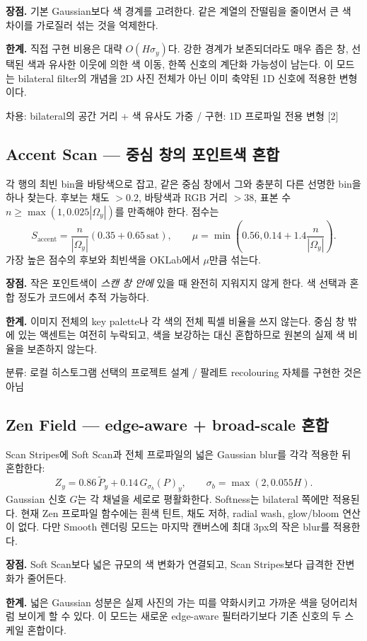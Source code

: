 \documentclass[10pt]{article}
\newcommand{\tagline}[1]{\textcolor{moss}{\small\textsf{#1}}}
\newcommand{\good}{\textbf{장점.} }
\newcommand{\trade}{\textbf{한계.} }
\begin{document}
\good 기본 Gaussian보다 색 경계를 고려한다. 같은 계열의 잔떨림을 줄이면서 큰 색 차이를 가로질러 섞는 것을 억제한다.

\trade 직접 구현 비용은 대략 $O(H\sigma_y)$다. 강한 경계가 보존되더라도 매우 좁은 창, 선택된 색과 유사한 이웃에 의한 색 이동, 한쪽 신호의 계단화 가능성이 남는다. 이 모드는 bilateral filter의 개념을 2D 사진 전체가 아닌 이미 축약된 1D 신호에 적용한 변형이다.

\tagline{차용: bilateral의 공간 거리 + 색 유사도 가중 / 구현: 1D 프로파일 전용 변형 [2]}

\subsection{Accent Scan --- 중심 창의 포인트색 혼합}
각 행의 최빈 bin을 바탕색으로 잡고, 같은 중심 창에서 그와 충분히 다른 선명한 bin을 하나 찾는다. 후보는 채도 $>0.2$, 바탕색과 RGB 거리 $>38$, 표본 수 $n\ge\max(1,0.025|\Omega_y|)$를 만족해야 한다. 점수는
\[
S_{\mathrm{accent}}=\frac{n}{|\Omega_y|}(0.35+0.65\,\mathrm{sat}),\qquad
\mu=\min\left(0.56,0.14+1.4\frac{n}{|\Omega_y|}\right).
\]
가장 높은 점수의 후보와 최빈색을 OKLab에서 $\mu$만큼 섞는다.

\good 작은 포인트색이 \emph{스캔 창 안에} 있을 때 완전히 지워지지 않게 한다. 색 선택과 혼합 정도가 코드에서 추적 가능하다.

\trade 이미지 전체의 key palette나 각 색의 전체 픽셀 비율을 쓰지 않는다. 중심 창 밖에 있는 액센트는 여전히 누락되고, 색을 보강하는 대신 혼합하므로 원본의 실제 색 비율을 보존하지 않는다.

\tagline{분류: 로컬 히스토그램 선택의 프로젝트 설계 / 팔레트 recolouring 자체를 구현한 것은 아님}

\subsection{Zen Field --- edge-aware + broad-scale 혼합}
Scan Stripes에 Soft Scan과 전체 프로파일의 넓은 Gaussian blur를 각각 적용한 뒤 혼합한다:
\[
Z_y=0.86\,\widetilde P_y+0.14\,G_{\sigma_b}(P)_y,\qquad \sigma_b=\max(2,0.055H).
\]
Gaussian 신호 $G$는 각 채널을 세로로 평활화한다. Softness는 bilateral 쪽에만 적용된다. 현재 Zen 프로파일 함수에는 흰색 틴트, 채도 저하, radial wash, glow/bloom 연산이 없다. 다만 Smooth 렌더링 모드는 마지막 캔버스에 최대 3px의 작은 blur를 적용한다.

\good Soft Scan보다 넓은 규모의 색 변화가 연결되고, Scan Stripes보다 급격한 잔변화가 줄어든다.

\trade 넓은 Gaussian 성분은 실제 사진의 가는 띠를 약화시키고 가까운 색을 덩어리처럼 보이게 할 수 있다. 이 모드는 새로운 edge-aware 필터라기보다 기존 신호의 두 스케일 혼합이다.
\end{document}
